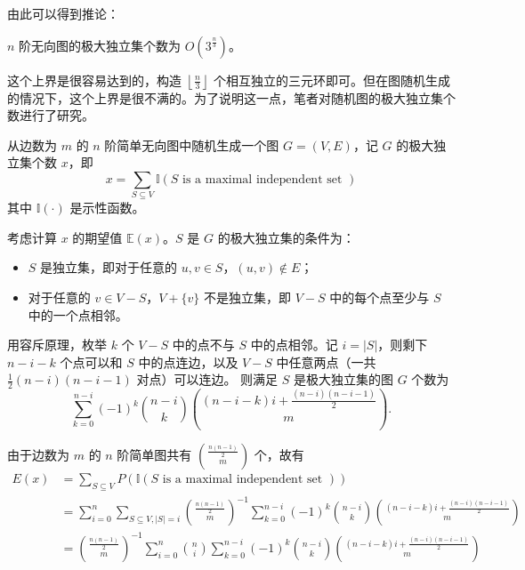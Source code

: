 \documentclass[lang=cn,11pt,a4paper]{elegantpaper}
\newcommand{\E}{\mathbb{E}}
\newcommand{\I}{\mathbb{I}}
\begin{document}
由此可以得到推论：
\begin{theorem}
    $n$ 阶无向图的极大独立集个数为 $O(3^{\frac{n}{3}})$。
\end{theorem}

这个上界是很容易达到的，构造 $\left\lfloor \frac{n}{3} \right\rfloor$ 个相互独立的三元环即可。但在图随机生成的情况下，这个上界是很不满的。为了说明这一点，笔者对随机图的极大独立集个数进行了研究。

从边数为 $m$ 的 $n$ 阶简单无向图中随机生成一个图 $G = (V, E)$，记 $G$ 的极大独立集个数 $x$，即
\[x=\sum_{S \subseteq V}\mathbb{I}(S \text { is a maximal independent set })\]
其中 $\mathbb{I}(\cdot)$ 是示性函数。

考虑计算 $x$ 的期望值 $\E(x)$。$S$ 是 $G$ 的极大独立集的条件为：
\begin{itemize}
    \item $S$ 是独立集，即对于任意的 $u, v \in S$，$(u, v) \notin E$；
    \item 对于任意的 $v \in V - S$，$V + \{v\}$ 不是独立集，即 $V - S$ 中的每个点至少与 $S$ 中的一个点相邻。
\end{itemize}

用容斥原理，枚举 $k$ 个 $V - S$ 中的点不与 $S$ 中的点相邻。记 $i = |S|$，则剩下 $n - i - k$ 个点可以和 $S$ 中的点连边，以及 $V - S$ 中任意两点（一共 $\frac{1}{2}(n - i)(n - i - 1)$ 对点）可以连边。 则满足 $S$ 是极大独立集的图 $G$ 个数为
\[\sum_{k=0}^{n-i}(-1)^{k}\binom{n - i}{k}\binom{(n-i-k) i+\frac{(n-i)(n-i-1)}{2}}{m}.\]

由于边数为 $m$ 的 $n$ 阶简单图共有 $\binom{\frac{n(n - 1)}{2}}{m}$ 个，故有
\begin{align*}
    E(x)&=\sum_{S \subseteq V} P(\I(S \text { is a maximal independent set })) \\
    &=\sum_{i=0}^{n} \sum_{S \subseteq V,|S|=i}\binom{\frac{n(n - 1)}{2}}{m}^{-1} \sum_{k=0}^{n-i}(-1)^{k}\binom{n - i}{k}\binom{(n-i-k) i+\frac{(n-i)(n-i-1)}{2}}{m}\\
    &=\binom{\frac{n(n - 1)}{2}}{m}^{-1} \sum_{i=0}^{n}\binom{n}{i}\sum_{k=0}^{n-i}(-1)^{k}\binom{n - i}{k}\binom{(n-i-k) i+\frac{(n-i)(n-i-1)}{2}}{m}
\end{align*}
\end{document}
